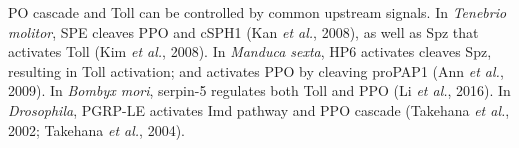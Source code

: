 \documentclass[11pt]{article}
\begin{document}
\newline

PO cascade and Toll can be controlled by common upstream signals. 
In \textit{Tenebrio molitor}, SPE cleaves PPO and cSPH1 (Kan \textit{et al.}, 2008), as well as Spz that activates Toll (Kim \textit{et al.}, 2008). 
In \textit{Manduca sexta}, HP6 activates cleaves Spz, resulting in Toll activation; and activates PPO by cleaving proPAP1 (Ann \textit{et al.}, 2009). 
In \textit{Bombyx mori}, serpin-5 regulates both Toll and PPO (Li \textit{et al.}, 2016). 
In \textit{Drosophila}, PGRP-LE activates Imd pathway and PPO cascade (Takehana \textit{et al.}, 2002; Takehana \textit{et al.}, 2004).
\end{document}
